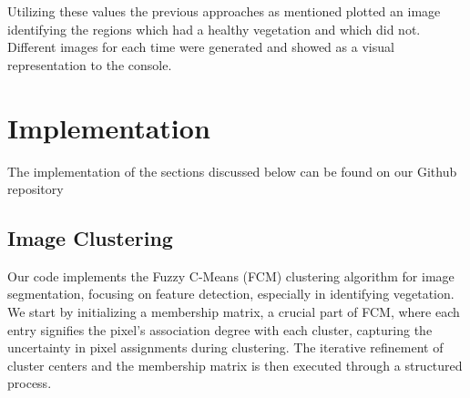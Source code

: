 \documentclass[12pt,a4paper,IEEEtran]{article}
\begin{document}
Utilizing these values the previous approaches as mentioned plotted an image identifying the regions which had a healthy vegetation and which did not. Different images for each time were generated and showed as a visual representation to the console. 

 


\section{Implementation}
The implementation of the sections discussed below can be found on our Github repository \cite{adip_group_project}
\subsection{Image Clustering}
Our code implements the Fuzzy C-Means (FCM) clustering algorithm for image segmentation, focusing on feature detection, especially in identifying vegetation. We start by initializing a membership matrix, a crucial part of FCM, where each entry signifies the pixel's association degree with each cluster, capturing the uncertainty in pixel assignments during clustering. The iterative refinement of cluster centers and the membership matrix is then executed through a structured process.  
\end{document}
